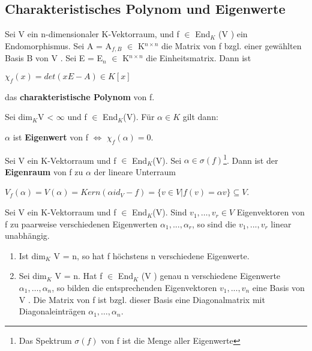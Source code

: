 \subsection{Charakteristisches Polynom und Eigenwerte}
\begin{definition}
Sei V ein n-dimensionaler K-Vektorraum, und f $\in$ End$_K$ (V ) ein Endomorphismus. Sei A = A$_{f,B}$ $\in$ K$^{n \times n}$ die Matrix von f bzgl. einer gewählten Basis B von V . Sei E = E$_n$ $\in$ K$^{n \times n}$ die Einheitsmatrix. Dann ist
\begin{center}
$\chi_f (x) = det(xE - A) \in K[x]$
\end{center}
das \textbf{charakteristische Polynom} von f.
\end{definition}

\begin{lemma}
Sei dim$_K$V < $\infty$ und f $\in$ End$_K$(V). Für $\alpha \in K$ gilt dann:
\begin{center}
$\alpha$ ist \textbf{Eigenwert} von f $\Leftrightarrow$ $\chi_f(\alpha) = 0$.
\end{center}
\end{lemma}

\begin{definition}
Sei V ein K-Vektorraum und f $\in$ End$_K$(V).
Sei $\alpha \in \sigma(f)$\footnote{Das Spektrum $\sigma(f)$ von f ist die Menge aller Eigenwerte}. Dann ist der \textbf{Eigenraum} von f zu $\alpha$ der lineare Unterraum
\begin{center}
$V_f(\alpha) = V(\alpha) = Kern(\alpha id_V - f) = \{v \in V | f(v) = \alpha v\} \subseteq V$.
\end{center}
\end{definition}

\begin{lemma}
Sei V ein K-Vektorraum und f $\in$ End$_K$(V). Sind $v_1, …, v_r \in V$ Eigenvektoren von f zu paarweise verschiedenen Eigenwerten $\alpha_1, ..., \alpha_r$, so sind die $v_1, ..., v_r$ linear unabhängig.
\begin{enumerate}
\item Ist dim$_K$ V = n, so hat f höchstens n verschiedene Eigenwerte.
\item Sei dim$_K$ V = n. Hat f $\in$ End$_K$ (V ) genau n verschiedene Eigenwerte $\alpha_1, …, \alpha_n$, so bilden die entsprechenden Eigenvektoren $v_1, ..., v_n$ eine Basis von V . Die Matrix von f ist bzgl. dieser Basis eine Diagonalmatrix mit Diagonaleinträgen $\alpha_1, …, \alpha_n$.
\end{enumerate}
\end{lemma}



